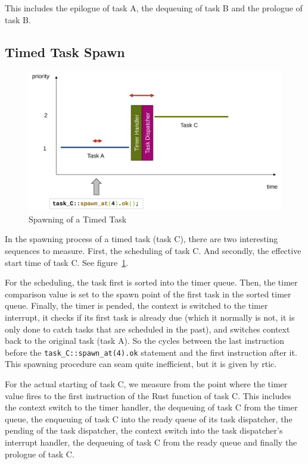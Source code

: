 This includes the epilogue of task A, the dequeuing of task B and the prologue of task B.

\subsection{Timed Task Spawn}

\begin{figure}
  \centerfloat
  \includegraphics[width=\textwidth]{fig/spawn_prio_timed.svg.pdf}
  \caption{Spawning of a Timed Task}%
  \label{fig:spawn_prio_timed}
\end{figure}

In the spawning process of a timed task (task C), there are two interesting sequences to measure. First, the scheduling of task C. And secondly, the effective start time of task C. See figure~\ref{fig:spawn_prio_timed}.

For the scheduling, the task first is sorted into the timer queue. Then, the timer comparison value is set to the spawn point of the first task in the sorted timer queue. Finally, the timer is pended, the context is switched to the timer interrupt, it checks if its first task is already due (which it normally is not, it is only done to catch tasks that are scheduled in the past), and switches context back to the original task (task A). So the cycles between the last instruction before the \texttt{task_C::spawn_at(4).ok} statement and the first instruction after it. This spawning procedure can seam quite inefficient, but it is given by \gls{rtic}.

For the actual starting of task C, we measure from the point where the timer value fires to the first instruction of the Rust function of task C.
This includes the context switch to the timer handler, the dequeuing of task C from the timer queue, the enqueuing of task C into the ready queue of its task dispatcher, the pending of the task dispatcher, the context switch into the task dispatcher's interrupt handler, the dequeuing of task C from the ready queue and finally the prologue of task C.

